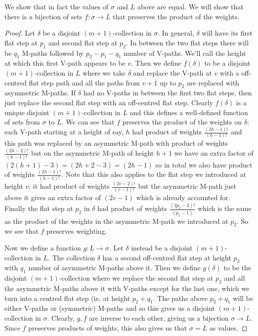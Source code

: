 \documentclass[11pt]{article}
\theoremstyle{definition}
\theoremstyle{definition}
\theoremstyle{plain}
\theoremstyle{plain}
\theoremstyle{plain}
\theoremstyle{definition}
\begin{document}
We show that in fact the values of $\sigma$ and $L$ above are equal. We will show that there is a bijection of sets $f:\sigma \to L$ that preserves the product of the weights.

\begin{proof}
Let $\delta$ be a disjoint $(m+1)$-collection in $\sigma$. In general, $\delta$ will have its first flat step at $p_1$ and second flat step at $p_2$. In between the two flat steps there will be $q_1$ M-paths followed by $p_2-p_1-q_1$ number of V-paths. We'll call the height at which this first V-path appears to be $v$. Then we define $f(\delta)$ to be a disjoint $(m+1)$-collection in $L$ where we take $\delta$ and replace the V-path at $v$ with a off-centred flat step path and all the paths from $v+1$ up to $p_2$ are replaced with asymmetric M-paths. If $\delta$ had no V-paths in between the first two flat steps, then just replace the second flat step with an off-centred flat step. Clearly $f(\delta)$ is a unique disjoint $(m+1)$-collection in $L$ and this defines a well-defined function of sets from $\sigma$ to $L$. We can see that $f$ preserves the product of the weights on $\delta$: each V-path starting at a height of say, $h$ had product of weights $\frac{(2h-1)!}{(h-1)!}$ and this path was replaced by an asymmetric M-path with product of weights $\frac{(2h-2)!}{(h-1)!}$ but on the asymmetric M-path of height $h+1$ we have an extra factor of $(2(h+1)-3) = (2h+2-3) = (2h-1)$ so in total we also have product of weights $\frac{(2h-1)!}{(h-1)!}$. Note that this also applies to the flat step we introduced at height $v$: it had product of weights $\frac{(2v-2)!}{(v-1)!}$ but the asymmetric M-path just above it gives an extra factor of $(2v-1)$ which is already accounted for. Finally the flat step at $p_2$ in $\delta$ had product of weights $\frac{(2p_2-2)!}{(p_2-1)}$ which is the same as the product of the weights in the asymmetric M-path we introduced at $p_2$. So we see that $f$ preserves weighting.

Now we define a function $g:L\to\sigma$. Let $\delta$ instead be a disjoint $(m+1)$-collection in $L$. The collection $\delta$ has a second off-centred flat step at height $p_2$ with $q_1$ number of asymmetric M-paths above it. Then we define $g(\delta)$ to be the disjoint $(m+1)$-collection where we replace the second flat step at $p_2$ and all the asymmetric M-paths above it with V-paths except for the last one, which we turn into a centred flat step (ie. at height $p_2+q_1$. The paths above $p_2+q_1$ will be either V-paths or (symmetric) M-paths and so this gives us a disjoint $(m+1)$-collection in $\sigma$. Clearly, $g,f$ are inverse to each other, giving us a bijection $\sigma\to L$. Since $f$ preserves products of weights, this also gives us that $\sigma = L$ as values.
\end{proof}
\end{document}

